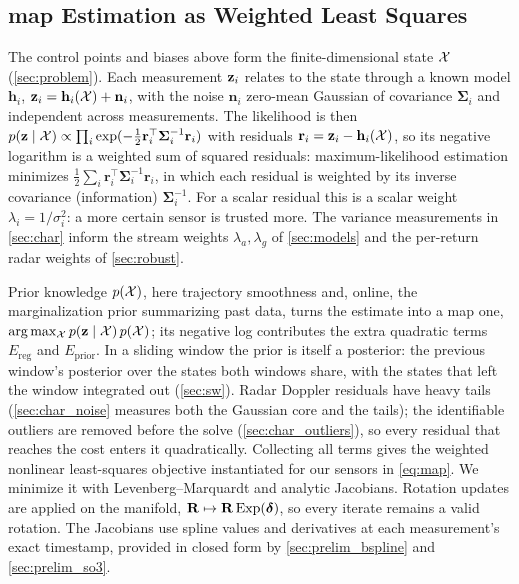 \subsection{\ac{map} Estimation as Weighted Least Squares}
\label{sec:prelim_map}
The control points and biases above form the finite-dimensional state
$\mathcal{X}$ (\autoref{sec:problem}).  Each measurement $\mathbf{z}_i$ relates to
the state through a known model $\mathbf{h}_i$,
$\mathbf{z}_i = \mathbf{h}_i(\mathcal{X}) + \mathbf{n}_i$, with the noise
$\mathbf{n}_i$ zero-mean Gaussian of covariance
$\boldsymbol{\Sigma}_i$ and independent across measurements.  The
likelihood is then
$p(\mathbf{z}\mid\mathcal{X})\propto\prod_i
 \exp(-\tfrac12\mathbf{r}_i^{\top}\boldsymbol{\Sigma}_i^{-1}\mathbf{r}_i)$
with residuals $\mathbf{r}_i=\mathbf{z}_i-\mathbf{h}_i(\mathcal{X})$, so its negative
logarithm is a weighted sum of squared residuals: maximum-likelihood
estimation minimizes
$\tfrac12\sum_i\mathbf{r}_i^{\top}\boldsymbol{\Sigma}_i^{-1}\mathbf{r}_i$,
in which each residual is weighted by its inverse covariance
(information) $\boldsymbol{\Sigma}_i^{-1}$.  For a scalar residual this
is a scalar weight $\lambda_i=1/\sigma_i^2$: a more certain sensor is
trusted more.  The variance measurements in \autoref{sec:char}
inform the stream weights $\lambda_a,\lambda_g$ of
\autoref{sec:models} and the per-return radar weights of
\autoref{sec:robust}.

Prior knowledge $p(\mathcal{X})$, here trajectory smoothness and, online, the
marginalization prior summarizing past data, turns the estimate into a
\ac{map} one, $\arg\max_{\mathcal{X}} p(\mathbf{z}\mid\mathcal{X})\,p(\mathcal{X})$; its negative
log contributes the extra quadratic terms $E_{\text{reg}}$ and
$E_{\text{prior}}$.  In a sliding window the prior is itself a
posterior: the previous window's posterior over the states both
windows share, with the states that left the window integrated out
(\autoref{sec:sw}).  Radar Doppler residuals have heavy tails
(\autoref{sec:char_noise} measures both the Gaussian core and the
tails); the identifiable outliers are removed before the solve
(\autoref{sec:char_outliers}), so every residual that reaches the
cost enters it quadratically.  Collecting all terms gives the weighted nonlinear
least-squares objective instantiated for our sensors in
\eqref{eq:map}.  We minimize it with Levenberg--Marquardt and
analytic Jacobians.  Rotation updates are applied on the manifold,
$\mathbf{R}\mapsto\mathbf{R}\,\mathrm{Exp}(\boldsymbol{\delta})$, so every iterate
remains a valid rotation.  The Jacobians use spline values and
derivatives at each measurement's exact timestamp, provided in
closed form by \autoref{sec:prelim_bspline} and
\autoref{sec:prelim_so3}.
